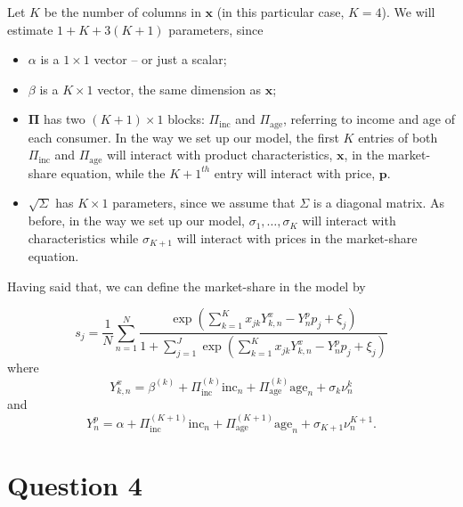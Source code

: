 \documentclass[a4paper,11pt]{article}
\begin{document}
Let $K$ be the number of columns in $\mathbf{x}$ (in this particular case, $K = 4$). We will estimate $1 + K + 3(K+1)$ parameters, since
\begin{itemize}
\item $\alpha$ is a $1\times 1$ vector -- or just a scalar;
\item $\beta$ is a $K \times 1$ vector, the same dimension as $\mathbf{x}$;
\item $\mathbf{\Pi}$ has two $(K+1) \times 1$ blocks: $\Pi_{\mathrm{inc}}$ and $\Pi_{\mathrm{age}}$, referring to income and age of each consumer. In the way we set up our model, the first $K$ entries of both $\Pi_{\mathrm{inc}}$ and $\Pi_{\mathrm{age}}$ will interact with product characteristics, $\mathbf{x}$, in the market-share equation, while the $K+1^{th}$ entry will interact with price, $\mathbf{p}$.
\item $\sqrt{\Sigma}$ has $K\times 1$ parameters, since we assume that $\Sigma$ is a diagonal matrix. As before, in the way we set up our model, $\sigma_{1}, \ldots, \sigma_{K}$ will interact with characteristics while $\sigma_{K+1}$ will interact with prices in the market-share equation.
\end{itemize}

Having said that, we can define the market-share in the model by

\[ s_j = \frac{1}{N}\sum_{n=1}^N \frac{\exp\left(\sum_{k=1}^K
x_{jk}Y^x_{k,n} - Y^p_{n}p_j + \xi_j \right)}{ 1 + \sum_{j = 1}^J\exp\left(\sum_{k=1}^K x_{jk}Y^x_{k,n} - Y^p_{n}p_j + \xi_j \right)} \]
where
\[ Y^x_{k,n} = \beta^{(k)} + \Pi_{\mathrm{inc}}^{(k)}\mathrm{inc}_n + \Pi_{\mathrm{age}}^{(k)}\mathrm{age}_n + \sigma_k \nu_n^k\]
and
\[ Y^p_{n} = \alpha + \Pi_{\mathrm{inc}}^{(K+1)}\mathrm{inc}_n + \Pi_{\mathrm{age}}^{(K+1)}\mathrm{age}_n + \sigma_{K+1}\nu_n^{K+1}. \]

\section*{Question 4}
\end{document}
